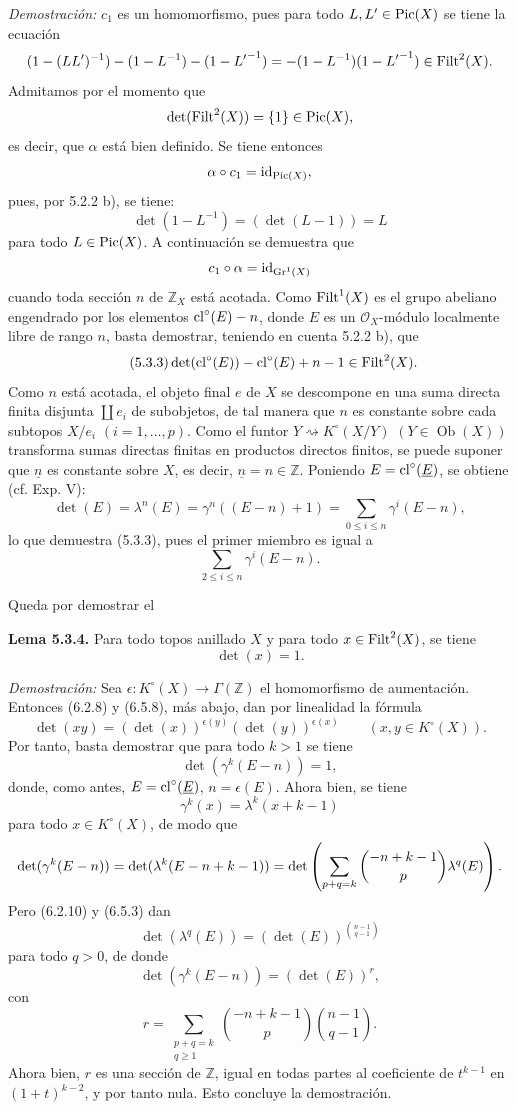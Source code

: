 \emph{Demostración:} \(c_1\) es un homomorfismo, pues para todo \(L,L'\in\operatorname{Pic}(X)\) se tiene la ecuación
\[
 (1-(LL')^{-1})-(1-L^{-1})-(1-{L'}^{-1})
 =
 -(1-L^{-1})(1-{L'}^{-1})\in\operatorname{Filt}^2(X).
\]
Admitamos por el momento que
\[
 \det(\operatorname{Filt}^2(X))=\{1\}\in\operatorname{Pic}(X),
\]
es decir, que \(\alpha\) está bien definido. Se tiene entonces
\[
 \alpha\circ c_1=\operatorname{id}_{\operatorname{Pic}(X)},
\]
pues, por 5.2.2 b), se tiene:
\[
 \det(1-L^{-1})=(\det(L-1))=L
\]
para todo \(L\in\operatorname{Pic}(X)\). A continuación se demuestra que
\[
 c_1\circ\alpha=\operatorname{id}_{\operatorname{Gr}^1(X)}
\]
cuando toda sección \(n\) de \(\mathbb Z_X\) está acotada. Como \(\operatorname{Filt}^1(X)\) es el grupo abeliano engendrado por los elementos \(\operatorname{cl}^\circ(E)-n\), donde \(E\) es un \(\mathcal O_X\)-módulo localmente libre de rango \(n\), basta demostrar, teniendo en cuenta 5.2.2 b), que
\begin{equation}\tag{5.3.3}
 \det(\cl^\circ(E))-\cl^\circ(E)+\sisi{N}{n}-1\in\Filt^2(X). %
\end{equation}
Como \(n\) está acotada, el objeto final \(e\) de \(X\) se descompone en una suma directa finita disjunta \(\coprod e_i\) de subobjetos, de tal manera que \(n\) es constante sobre cada subtopos \(X/e_i\) \((i=1,\ldots,p)\). Como el funtor \(Y\rightsquigarrow K^\circ(X/Y)\) \((Y\in\operatorname{Ob}(X))\) transforma sumas directas finitas en productos directos finitos, se puede suponer que \(\underline n\) es constante sobre \(X\), es decir, \(\underline n=n\in\mathbb Z\). Poniendo \(E=\operatorname{cl}^\circ(\underline E)\), se obtiene (cf. Exp. V):
\[
 \det(E)=\lambda^n(E)=\gamma^n((E-n)+1)
 =
 \sum_{0\leq i\leq n}\gamma^i(E-n),
\]
lo que demuestra (5.3.3), pues el primer miembro es igual a
\[
 \sum_{2\leq i\leq n}\gamma^i(E-n).
\]

Queda por demostrar el

\textbf{Lema 5.3.4.} Para todo topos anillado \(X\) y para todo \(x\in\operatorname{Filt}^2(X)\), se tiene
\[
 \det(x)=1.
\]

\emph{Demostración:} Sea \(\epsilon:K^\circ(X)\to\Gamma(\mathbb Z)\) el homomorfismo de aumentación. Entonces (6.2.8) y (6.5.8), más abajo, dan por linealidad la fórmula
\begin{equation}\tag{5.3.5}
 \det(xy)=(\det(x))^{\epsilon(y)}(\det(y))^{\epsilon(x)}
 \qquad(x,y\in K^\circ(X)).
\end{equation}
Por tanto, basta demostrar que para todo \(k>1\) se tiene
\[
 \det(\gamma^k(E-n))=1,
\]
donde, como antes, \(E=\operatorname{cl}^\circ(\underline E)\), \(n=\epsilon(E)\). Ahora bien, se tiene
\[
 \gamma^k(x)=\lambda^k(x+k-1)
\]
para todo \(x\in K^\circ(X)\), de modo que
\[
 \det(\gamma^k(E-n))
 =
 \det(\lambda^k(E-n+k-1))
 =
 \det\left(\sum_{p+q=k}\binom{\sisi{n}{-n}+k-1}{p}\lambda^q(E)\right). %
\]
Pero (6.2.10) y (6.5.3) dan
\[
 \det(\lambda^q(E))=(\det(E))^{\binom{n-1}{q-1}}
\]
para todo \(q>0\), de donde
\[
 \det(\gamma^k(E-n))=(\det(E))^r,
\]
con
\[
 r=\sum_{\substack{p+q=k\\ q\geq1}}
 \binom{-n+k-1}{p}\binom{n-1}{q-1}.
\]
Ahora bien, \(r\) es una sección de \(\mathbb Z\), igual en todas partes al coeficiente de \(t^{k-1}\) en \((1+t)^{k-2}\), y por tanto nula. Esto concluye la demostración.
